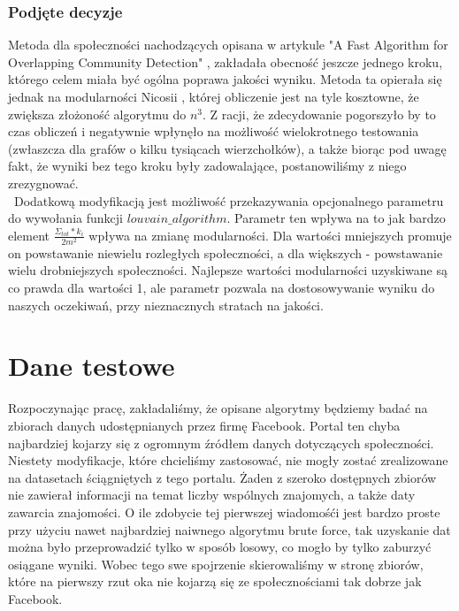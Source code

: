 \documentclass{article}
\begin{document}
\subsubsection{Podjęte decyzje}
Metoda dla społeczności nachodzących opisana w artykule "A Fast Algorithm for Overlapping Community Detection" \cite{pw-paper3}, zakładała obecność jeszcze jednego kroku, którego celem miała być ogólna poprawa jakości wyniku. Metoda ta opierała się jednak na modularności Nicosii \cite{pw-paper2}, której obliczenie jest na tyle kosztowne, że zwiększa złożoność algorytmu do $n^3$. Z racji, że zdecydowanie pogorszyło by to czas obliczeń i negatywnie wpłynęło na możliwość wielokrotnego testowania (zwłaszcza dla grafów o kilku tysiącach wierzchołków), a także biorąc pod uwagę fakt, że wyniki bez tego kroku były zadowalające, postanowiliśmy z niego zrezygnować.\\\ Dodatkową modyfikacją jest możliwość przekazywania  opcjonalnego parametru do wywołania funkcji $louvain\_ algorithm$. Parametr ten wpływa na to jak bardzo element $\frac{\Sigma_{tot}*k_i}{2m^2}$ wpływa na zmianę modularności. Dla wartości mniejszych promuje on powstawanie niewielu rozległych społeczności, a dla większych - powstawanie wielu drobniejszych społeczności. Najlepsze wartości modularności uzyskiwane są co prawda dla wartości 1, ale parametr pozwala na dostosowywanie wyniku do naszych oczekiwań, przy nieznacznych stratach na jakości.

\section{Dane testowe}
Rozpoczynając pracę, zakładaliśmy, że opisane algorytmy będziemy badać na zbiorach danych udostępnianych przez firmę Facebook. Portal ten chyba najbardziej kojarzy się z ogromnym źródłem danych dotyczących społeczności. Niestety modyfikacje, które chcieliśmy zastosować, nie mogły zostać zrealizowane na datasetach ściągniętych z tego portalu. Żaden z szeroko dostępnych zbiorów nie zawierał informacji na temat liczby wspólnych znajomych, a także daty zawarcia znajomości. O ile zdobycie tej pierwszej wiadomośći jest bardzo proste przy użyciu nawet najbardziej naiwnego algorytmu brute force, tak uzyskanie dat można było przeprowadzić tylko w sposób losowy, co mogło by tylko zaburzyć osiągane wyniki. Wobec tego swe spojrzenie skierowaliśmy w stronę zbiorów, które na pierwszy rzut oka nie kojarzą się ze społecznościami tak dobrze jak Facebook.
\end{document}
